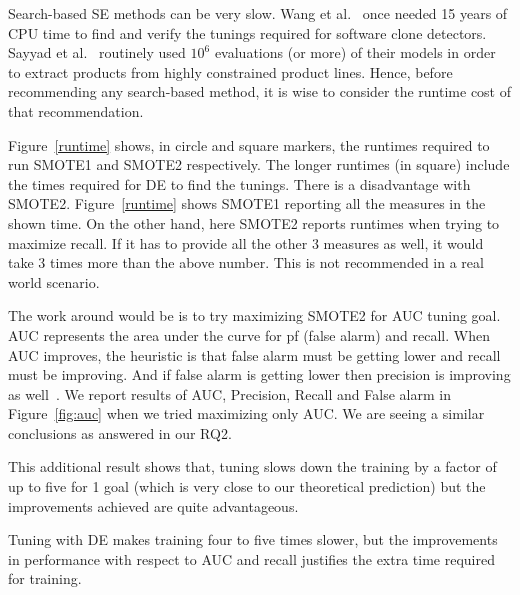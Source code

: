 Search-based SE methods can be very slow. Wang et al.~\cite{wang2013searching} once needed 15
years of CPU time to find and verify the tunings required for software
clone detectors. Sayyad et al.~\cite{sayyad2013scalable} routinely used
$10^6$ evaluations (or more) of their models in order to extract
products from highly constrained product
lines. Hence, before recommending any
search-based method, it is wise to consider the runtime cost of that
recommendation.

 Figure~\ref{runtime} shows,  in circle and square markers, the
  runtimes required to run SMOTE1 and SMOTE2 respectively.  The
  longer runtimes (in square) include the times required for DE to find
  the tunings. There is a disadvantage with SMOTE2. Figure~\ref{runtime} shows SMOTE1 reporting all the measures in the shown time. On the other hand, here SMOTE2 reports runtimes when trying to maximize recall. If it has to provide all the other 3 measures as well, it would take 3 times more than the above number. This is not recommended in a real world scenario. 
  
  The work around would be is to try maximizing SMOTE2 for AUC tuning goal. AUC represents the area under the curve for pf (false alarm) and recall. When AUC improves, the heuristic is that false alarm must be getting lower and recall must be improving. And if false alarm is getting lower then precision is improving as well~\cite{menzies2007data}. We report results of AUC, Precision, Recall and False alarm in Figure~\ref{fig:auc} when we tried maximizing only AUC. We are seeing a similar conclusions as answered in our RQ2. 
  
  This additional result shows that, tuning slows down the training by a factor of up to
  five for 1 goal (which is very close to our theoretical prediction) but the improvements achieved are quite advantageous.

\begin{lesson1}
    Tuning with DE makes training four to five times slower, but the improvements in performance with respect to AUC and recall justifies the extra time required for training.
\end{lesson1}

